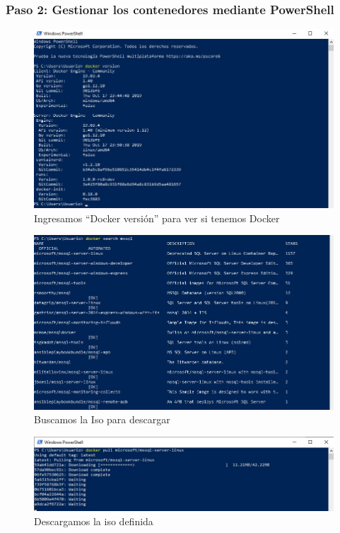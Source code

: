 \documentclass[preprint,12pt]{elsarticle}
\begin{document}
\subsubsection{\textbf{Paso 2: Gestionar los contenedores mediante PowerShell}}

\begin{figure}[H]
	\begin{center}
		\includegraphics[width=12cm]{./IMAGENES/foto5} 
		\caption{Ingresamos “Docker versión” para ver si tenemos Docker}
	\end{center}
\end{figure}


\begin{figure}[H]
	\begin{center}
		\includegraphics[width=12cm]{./IMAGENES/foto6} 
		\caption{Buscamos la Iso para descargar}
	\end{center}
\end{figure}

\begin{figure}[H]
	\begin{center}
		\includegraphics[width=12cm]{./IMAGENES/foto7} 
		\caption{Descargamos la iso definida}
	\end{center}
\end{figure}
\end{document}
